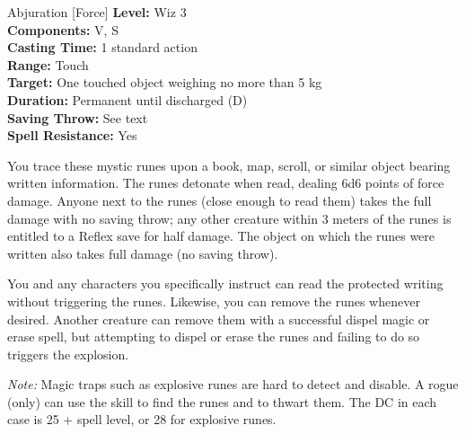 {Abjuration [Force]}
{
	\textbf{Level:}
	Wiz 3\\
	\textbf{Components:}
	V, S\\
	\textbf{Casting Time:}
	1 standard action\\
	\textbf{Range:}
	Touch\\
	\textbf{Target:}
	One touched object weighing no more than 5 kg\\
	\textbf{Duration:}
	Permanent until discharged (D)\\
	\textbf{Saving Throw:}
	See text\\
	\textbf{Spell Resistance:}
	Yes\\
}
{
	You trace these mystic runes upon a book, map, scroll, or similar object bearing written information. The runes detonate when read, dealing 6d6 points of force damage. Anyone next to the runes (close enough to read them) takes the full damage with no saving throw; any other creature within 3 meters of the runes is entitled to a Reflex save for half damage. The object on which the runes were written also takes full damage (no saving throw).

	You and any characters you specifically instruct can read the protected writing without triggering the runes. Likewise, you can remove the runes whenever desired. Another creature can remove them with a successful dispel magic or erase spell, but attempting to dispel or erase the runes and failing to do so triggers the explosion.

	\textit{Note:} Magic traps such as explosive runes are hard to detect and disable. A rogue (only) can use the  skill to find the runes and  to thwart them. The DC in each case is 25 + spell level, or 28 for explosive runes.

}
